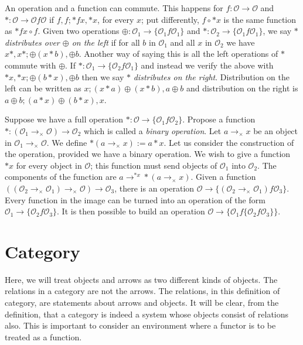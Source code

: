 \documentclass [12pt]{book}
\begin{document}
An operation and a function can commute. This happens for $f:\mathcal O\rightarrow\mathcal O$ and $*:\mathcal O\rightarrow\mathcal Of\mathcal O$ if $f,f;*fx,*x$, for every $x$; put differently, $f\circ *x$ is the same function as $*fx\circ f$. Given two operations $\oplus:\mathcal O_1\rightarrow\{\mathcal O_1f\mathcal O_1\}$ and $*:\mathcal O_2\rightarrow\{\mathcal O_1f\mathcal O_1\}$, we say \textit{$*$ distributes over $\oplus$ on the left} if for all $b$ in $\mathcal O_1$ and all $x$ in $\mathcal O_2$ we have $x*,x*;\oplus(x*b),\oplus b$. Another way of saying this is all the left operations of $*$ commute with $\oplus$. If $*:\mathcal O_1\rightarrow\{\mathcal O_2f\mathcal O_1\}$ and instead we verify the above with $*x,*x;\oplus(b*x),\oplus b$ then we say $*$ \textit{distributes on the right}. Distribution on the left can be written as $x;(x*a)\oplus(x*b),a\oplus b$ and distribution on the right is $a\oplus b;(a*x)\oplus(b*x),x$.

Suppose we have a full operation $*:\mathcal O\rightarrow\{\mathcal O_1f\mathcal O_2\}$. Propose a function $*:(\mathcal O_1\rightarrow_\times\mathcal O)\longrightarrow\mathcal O_2$ which is called a \textit{binary operation}. Let $a\rightarrow_\times x$ be an object in $\mathcal O_1\rightarrow_\times\mathcal O$. We define $*(a\rightarrow_\times x):=a*x$. Let us consider the construction of the operation, provided we have a binary operation. We wish to give a function $*x$ for every object in $\mathcal O$; this function must send objects of $\mathcal O_1$ into $\mathcal O_2$. The components of the function are $a\rightarrow^{*x}*(a\rightarrow_\times x)$. Given a function $((\mathcal O_2\rightarrow_\times\mathcal O_1)\rightarrow_\times\mathcal O)\longrightarrow\mathcal O_3$, there is an operation $\mathcal O\rightarrow\{(\mathcal O_2\rightarrow_\times\mathcal O_1)f\mathcal O_3\}$. Every function in the image can be turned into an operation of the form $\mathcal O_1\rightarrow\{\mathcal O_2f\mathcal O_3\}$. It is then possible to build an operation $\mathcal O\rightarrow\{\mathcal O_1f\{\mathcal O_2f\mathcal O_3\}\}$.


\chapter{Category}

Here, we will treat objects and arrows as two different kinds of objects. The relations in a category are not the arrows. The relations, in this definition of category, are statements about arrows and objects. It will be clear, from the definition, that a category is indeed a system whose objects consist of relations also. This is important to consider an environment where a functor is to be treated as a function.
\end{document}
